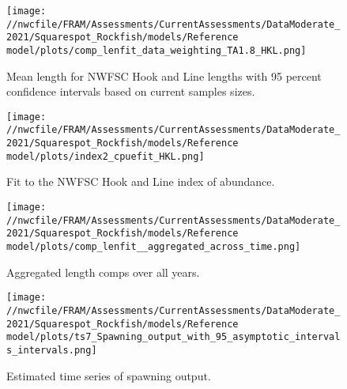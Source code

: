 \documentclass[11pt,
  english,
  a4paper,
]{article}
\begin{document}
\tagmcend\tagstructend


\begin{figure}
\centering
\texttt{[image: //nwcfile/FRAM/Assessments/CurrentAssessments/DataModerate\_2021/Squarespot\_Rockfish/models/Reference model/plots/comp\_lenfit\_data\_weighting\_TA1.8\_HKL.png]}
\caption{Mean length for NWFSC Hook and Line lengths with 95 percent confidence intervals based on current samples sizes.\label{fig:hkl-mean-len-fit}}
\end{figure}

\tagmcend\tagstructend


\begin{figure}
\centering
\texttt{[image: //nwcfile/FRAM/Assessments/CurrentAssessments/DataModerate\_2021/Squarespot\_Rockfish/models/Reference model/plots/index2\_cpuefit\_HKL.png]}
\caption{Fit to the NWFSC Hook and Line index of abundance.\label{fig:hkl-index-fit}}
\end{figure}

\tagmcend\tagstructend


\begin{figure}
\centering
\texttt{[image: //nwcfile/FRAM/Assessments/CurrentAssessments/DataModerate\_2021/Squarespot\_Rockfish/models/Reference model/plots/comp\_lenfit\_\_aggregated\_across\_time.png]}
\caption{Aggregated length comps over all years.\label{fig:agg-len-fit}}
\end{figure}

\tagmcend\tagstructend


\begin{figure}
\centering
\texttt{[image: //nwcfile/FRAM/Assessments/CurrentAssessments/DataModerate\_2021/Squarespot\_Rockfish/models/Reference model/plots/ts7\_Spawning\_output\_with\_95\_asymptotic\_intervals\_intervals.png]}
\caption{Estimated time series of spawning output.\label{fig:ssb}}
\end{figure}
\end{document}
